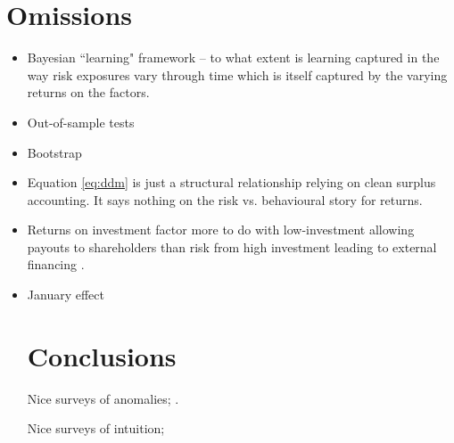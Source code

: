 
\section{Omissions}

\begin{itemize}
  \item Bayesian ``learning" framework \textcite{nagel2013empirical} -- to what extent is
    learning captured in the way risk exposures vary through time which is itself captured
    by the varying returns on the factors.
  \item Out-of-sample tests
  \item Bootstrap
  \item Equation \ref{eq:ddm} is just a structural relationship relying on clean surplus
    accounting. It says nothing on the risk vs. behavioural story for returns.
  \item Returns on investment factor more to do with low-investment allowing payouts to
    shareholders than risk from high investment leading to external financing
    \parencite{fama2008dissecting, daniel2006market, pontiff2008share}.
  \item January effect 

\section{Conclusions}

Nice surveys of anomalies;
\textcite{nagel2013empirical, fama2016dissecting}.

Nice surveys of intuition;
\textcite{cochrane2009asset, cochrane2011presidential, nagel2013empirical}


\end{itemize}
